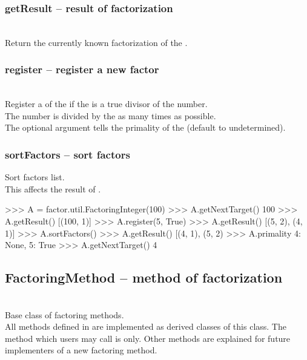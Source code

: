  \subsubsection{getResult -- result of factorization}
   \\
   \spacing
   \quad Return the currently known factorization of the .\\
%
 \subsubsection{register -- register a new factor}
   \\
   \spacing
   Register a  of the  if the  is a true divisor of the number.\\
   \spacing
   \quad The number is divided by the  as many times as possible.\\
   \spacing
   The optional argument  tells the primality of the
    (default to undetermined).\\
%
 \subsubsection{sortFactors -- sort factors}
   \spacing
   \quad Sort factors list.\\
   \spacing
    \quad This affects the result of .\\
%
\begin{ex}
>>> A = factor.util.FactoringInteger(100)
>>> A.getNextTarget()
100
>>> A.getResult()
[(100, 1)]
>>> A.register(5, True)
>>> A.getResult()
[(5, 2), (4, 1)]
>>> A.sortFactors()
>>> A.getResult()
[(4, 1), (5, 2)
>>> A.primality
{4: None, 5: True}
>>> A.getNextTarget()
4
\end{ex}%
\C

 \subsection{FactoringMethod -- method of factorization}
 \initialize
  \\
  \spacing
  \quad Base class of factoring methods.\\
  \spacing
  \quad All methods defined in  are
  implemented as derived classes of this class. The method which users may call is   only. 
  Other methods are explained for future implementers of a new factoring method.\\
  \method
